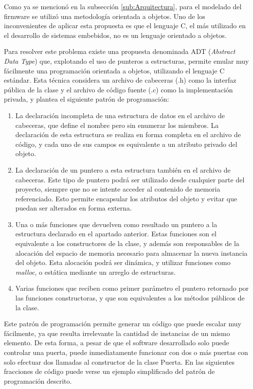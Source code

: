 Como ya se mencionó en la subsección \ref{sub:Arquitectura}, para el modelado del firmware se utilizó una metodología orientada a objetos. Uno de los inconvenientes de aplicar esta propuesta es que el lenguaje C, el más utilizado en el desarrollo de sistemas embebidos, no es un lenguaje orientado a objetos.

Para resolver este problema existe una propuesta denominada ADT (\emph{Abstract Data Type}) que, explotando el uso de punteros a estructuras, permite emular muy fácilmente una programación orientada a objetos, utilizando el lenguaje C estándar. Esta técnica considera un archivo de cabeceras (.h) como la interfaz pública de la clase y el archivo de código fuente (.c) como la implementación privada, y  plantea el siguiente patrón de programación:

\begin{enumerate}
	\item La declaración incompleta de una estructura de datos en el archivo de cabeceras, que define el nombre pero sin enumerar los miembros. La declaración de esta estructura se realiza en forma completa en el archivo de código, y cada uno de sus campos es equivalente a un atributo privado del objeto.
	
	\item La declaración de un puntero a esta estructura también en el archivo de cabeceras. Este tipo de puntero podrá ser utilizado desde cualquier parte del proyecto, siempre que no se intente acceder al contenido de memoria referenciado. Esto permite encapsular los atributos del objeto y evitar que puedan ser alterados en forma externa.
	 
	\item Una o más funciones que devuelven como resultado un puntero a la estructura declarado en el apartado anterior. Estas funciones son el equivalente a los constructores de la clase, y además son responsables de la alocación del espacio de memoria necesario para almacenar la nueva instancia del objeto. Esta alocación podrá ser dinámica, y utilizar funciones como \emph{malloc}, o estática mediante un arreglo de estructuras.
	
	\item Varias funciones que reciben como primer parámetro el puntero retornado por las funciones constructoras, y que son equivalentes a los métodos públicos de la clase. 
\end{enumerate}

Este patrón de programación permite generar un código que puede escalar muy fácilmente, ya que resulta irrelevante la cantidad de instancias de un mismo elemento. De esta forma, a pesar de que el software desarrollado solo puede controlar una puerta, puede inmediatamente funcionar con dos o más puertas con solo efectuar dos llamadas al constructor de la clase Puerta. En las siguientes fracciones de código puede verse un ejemplo simplificado del patrón de programación descrito.


